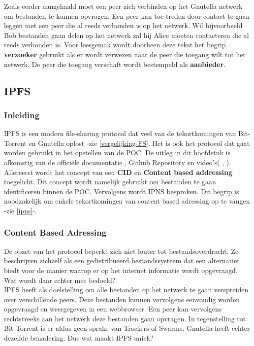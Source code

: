 Zoals eerder aangehaald moet een peer zich verbinden op het Gnutella netwerk om bestanden te kunnen opvragen. Een peer kan toe treden door contact te gaan leggen met een peer die al reeds verbonden is op het netwerk. Wil bijvoorbeeld Bob bestanden gaan delen op het netwerk zal hij Alice moeten contacteren die al reeds verbonden is. Voor leesgemak wordt doorheen deze tekst het begrip \textbf{verzoeker} gebruikt als er wordt verwezen naar de peer die toegang wilt tot het netwerk. De peer die toegang verschaft wordt bestempeld als \textbf{aanbieder}.\\


\subsection{IPFS}
\subsubsection{Inleiding}
IPFS is een modern file-sharing protocol dat veel van de tekortkomingen van Bit-Torrent en Gnutella oplost -zie \ref{vergelijking-FS}. Het is ook het protocol dat gaat worden gebruikt in het opstellen van de POC. De uitleg in dit hoofdstuk is afkomstig van de officiële documentatie \autocite{}, Github Repository \autocite{} en video's(\autocite{} , \autocite{}).\\

Allereerst wordt het concept van een \textbf{CID} en \textbf{Content based addressing} toegelicht. Dit concept wordt namelijk gebruikt om bestanden te gaan identificeren binnen de POC. Vervolgens wordt IPNS besproken. Dit begrip is noodzakelijk om enkele tekortkomingen van content based adressing op te vangen -zie \ref{ipns}-.

\subsubsection{Content Based Adressing}
\label{CBA}
 De opzet van het protocol beperkt zich niet louter tot bestandsoverdracht. Ze beschrijven zichzelf als een gedistribueerd bestandssysteem dat een alternatief biedt voor de manier waarop er op het internet informatie wordt opgevraagd. Wat wordt daar echter mee bedoeld?\\

IPFS heeft als doelstelling om alle bestanden op het netwerk te gaan verspreiden over verschillende peers. Deze bestanden kunnen vervolgens eenvoudig worden opgevraagd en weergegeven in een webbrowser. Een peer kan vervolgens rechtstreeks aan het netwerk deze bestanden gaan opvragen. In tegenstelling tot Bit-Torrent is er aldus geen sprake van Trackers of Swarms. Gnutella heeft echter dezelfde benadering. Dus wat maakt IPFS uniek?\\

